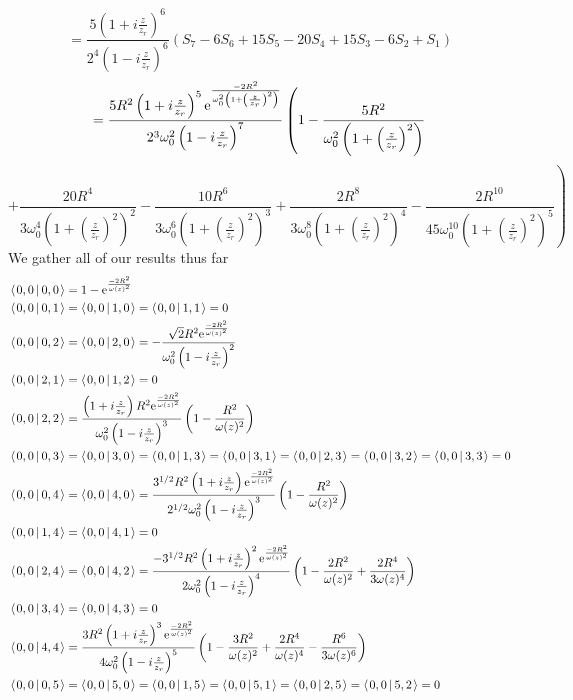 \documentclass[11pt]{amsart}
\makeatletter
\newcommand{\e}{{\rm e}}				%
\newcommand{\msp}[1]{\mspace{#1mu}}		%
\newcommand{\0}{\varnothing}		%
\newcommand{\brac}[2]{\left\langle\msp{2} #1\left\lvert \msp{3.5} #2 \right.\right\rangle}	%
\newcommand{\1}{!}
\newcommand{\2}{@}
\newcommand{\3}{\#}
\newcommand{\4}{\$}
\newcommand{\5}{\%}
\newcommand{\6}{$^\wedge$}
\newcommand{\7}{\&}
\newcommand{\8}{*}
\newcommand{\9}{(}
\makeatother
\begin{document}
\[
=\frac{5\left(1+i\frac{z}{z_r}\right)^6}{2^4\left(1-i\frac{z}{z_r}\right)^6}\left(S_7-6S_6+15S_5-20S_4+15S_3-6S_2+S_1\right)
\]
\[
=\frac{5R^2\left(1+i\frac{z}{z_r}\right)^5\e^{\frac{-2R^2}{\omega_0^2\left(1+\left(\frac{z}{z_r}\right)^2\right)}}}{2^3\omega_0^2\left(1-i\frac{z}{z_r}\right)^7}\left(1-\frac{5R^2}{\omega_0^2\left(1+\left(\frac{z}{z_r}\right)^2\right)}\right.
\]
\[
\left.+\frac{20R^4}{3\omega_0^4\left(1+\left(\frac{z}{z_r}\right)^2\right)^2}-\frac{10R^6}{3\omega_0^6\left(1+\left(\frac{z}{z_r}\right)^2\right)^3}+\frac{2R^8}{3\omega_0^8\left(1+\left(\frac{z}{z_r}\right)^2\right)^4}-\frac{2R^{10}}{45\omega_0^{10}\left(1+\left(\frac{z}{z_r}\right)^2\right)^5}\right)
\]
We gather all of our results thus far
\begin{align*}
&\brac{0,0}{0,0} = 1-\e^{\frac{-2R^2}{\omega(z)^2}}
\\
&\brac{0,0}{0,1} = \brac{0,0}{1,0} = \brac{0,0}{1,1} = 0
\\
&\brac{0,0}{0,2} = \brac{0,0}{2,0} = -\frac{\sqrt{2}R^2\e^{\frac{-2R^2}{\omega(z)^2}}}{\omega_0^2\left(1-i\frac{z}{z_r}\right)^2}
\\
&\brac{0,0}{2,1} = \brac{0,0}{1,2} = 0
\\
&\brac{0,0}{2,2} = \frac{\left(1+i\frac{z}{z_r}\right)R^2\e^{\frac{-2R^2}{\omega(z)^2}}}{\omega_0^2\left(1-i\frac{z}{z_r}\right)^3}\left(1-\frac{R^2}{\omega(z)^2}\right)
\\
&\brac{0,0}{0,3} = \brac{0,0}{3,0} = \brac{0,0}{1,3} = \brac{0,0}{3,1} = \brac{0,0}{2,3} = \brac{0,0}{3,2} = \brac{0,0}{3,3} = 0
\\
&\brac{0,0}{0,4} = \brac{0,0}{4,0} = \frac{3^{1/2}R^2\left(1+i\frac{z}{z_r}\right)\e^{\frac{-2R^2}{\omega(z)^2}}}{2^{1/2}\omega_0^2\left(1-i\frac{z}{z_r}\right)^3}\left(1-\frac{R^2}{\omega(z)^2}\right)
\\
&\brac{0,0}{1,4} = \brac{0,0}{4,1} = 0
\\
&\brac{0,0}{2,4} = \brac{0,0}{4,2} = \frac{-3^{1/2}R^2\left(1+i\frac{z}{z_r}\right)^2\e^{\frac{-2R^2}{\omega(z)^2}}}{2\omega_0^2\left(1-i\frac{z}{z_r}\right)^4}\left(1-\frac{2R^2}{\omega(z)^2}+\frac{2R^4}{3\omega(z)^4}\right)
\\
&\brac{0,0}{3,4} = \brac{0,0}{4,3} = 0
\\
&
\brac{0,0}{4,4} = \frac{3R^2\left(1+i\frac{z}{z_r}\right)^3\e^{\frac{-2R^2}{\omega(z)^2}}}{4\omega_0^2\left(1-i\frac{z}{z_r}\right)^5}\left(1-\frac{3R^2}{\omega(z)^2}+\frac{2R^4}{\omega(z)^4}-\frac{R^6}{3\omega(z)^6}\right)
\\
&
\brac{0,0}{0,5} = \brac{0,0}{5,0} =\brac{0,0}{1,5} = \brac{0,0}{5,1} = \brac{0,0}{2,5} = \brac{0,0}{5,2} = 0

\end{align*}
\end{document}
